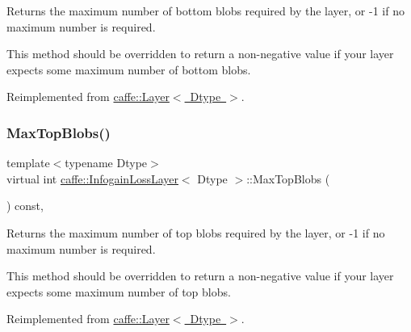 Returns the maximum number of bottom blobs required by the layer, or -\/1 if no maximum number is required. 

This method should be overridden to return a non-\/negative value if your layer expects some maximum number of bottom blobs. 

Reimplemented from \mbox{\hyperlink{classcaffe_1_1_layer_af8bdc989053e0363ab032026b46de7c3}{caffe\+::\+Layer$<$ Dtype $>$}}.

\mbox{\label{classcaffe_1_1_infogain_loss_layer_a93019601c6256354fd4758da91d9311f}} 
\subsubsection{\texorpdfstring{Max\+Top\+Blobs()}{MaxTopBlobs()}\hspace{0.1cm}{\footnotesize\ttfamily [1/2]}}
{\footnotesize\ttfamily template$<$typename Dtype$>$ \\
virtual int \mbox{\hyperlink{classcaffe_1_1_infogain_loss_layer}{caffe\+::\+Infogain\+Loss\+Layer}}$<$ Dtype $>$\+::Max\+Top\+Blobs (\begin{DoxyParamCaption}{ }\end{DoxyParamCaption}) const\hspace{0.3cm}{\ttfamily [inline]}, {\ttfamily [virtual]}}



Returns the maximum number of top blobs required by the layer, or -\/1 if no maximum number is required. 

This method should be overridden to return a non-\/negative value if your layer expects some maximum number of top blobs. 

Reimplemented from \mbox{\hyperlink{classcaffe_1_1_layer_ac6c03df0b6e40e776c94001e19994a2e}{caffe\+::\+Layer$<$ Dtype $>$}}.

\mbox{\label{classcaffe_1_1_infogain_loss_layer_a93019601c6256354fd4758da91d9311f}} 
